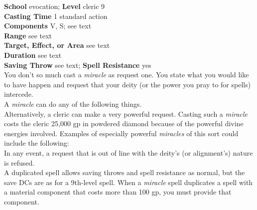 \textbf{School} evocation; \textbf{Level} cleric 9\\
\textbf{Casting Time} 1 standard action\\
\textbf{Components} V, S; see text\\
\textbf{Range} see text\\
\textbf{Target, Effect, or Area }see text\\
\textbf{Duration} see text\\
\textbf{Saving Throw} see text; \textbf{Spell Resistance} yes\\
You don't so much cast a \textit{miracle }as request one. You state what you would like to have happen and request that your deity (or the power you pray to for spells) intercede.\\
A \textit{miracle }can do any of the following things.\\
Alternatively, a cleric can make a very powerful request. Casting such a \textit{miracle }costs the cleric 25,000 gp in powdered diamond because of the powerful divine energies involved. Examples of especially powerful \textit{miracles }of this sort could include the following:\\
In any event, a request that is out of line with the deity's (or alignment's) nature is refused.\\
A duplicated spell allows saving throws and spell resistance as normal, but the save DCs are as for a 9th-level spell. When a \textit{miracle }spell duplicates a spell with a material component that costs more than 100 gp, you must provide that component.\\
